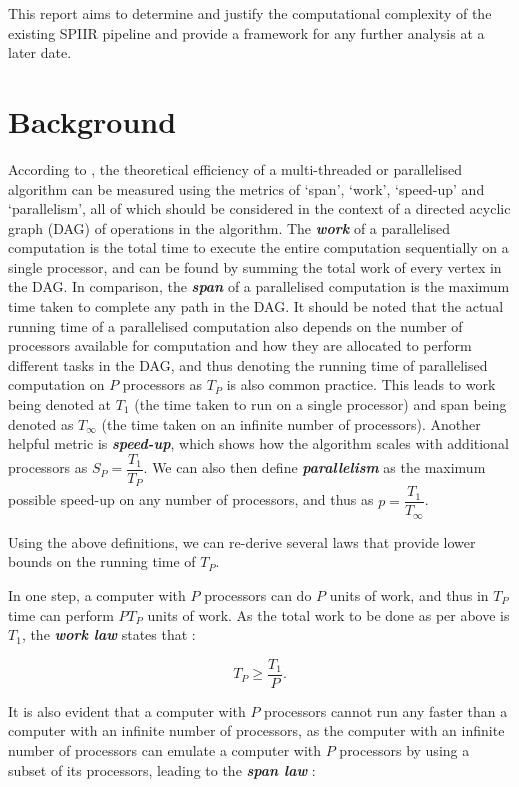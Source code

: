\documentclass{article}
\begin{document}
This report aims to determine and justify the computational complexity of the existing SPIIR pipeline and provide a framework for any further analysis at a later date.

\section{Background} \label{sec:background}

According to \cite{CLRS}, the theoretical efficiency of a multi-threaded or parallelised algorithm can be measured using the metrics of `span', `work', `speed-up' and `parallelism', all of which should be considered in the context of a directed acyclic graph (DAG) of operations in the algorithm.
The \textit{\textbf{work}} of a parallelised computation is the total time to execute the entire computation sequentially on a single processor, and can be found by summing the total work of every vertex in the DAG.
In comparison, the \textit{\textbf{span}} of a parallelised computation is the maximum time taken to complete any path in the DAG.
It should be noted that the actual running time of a parallelised computation also depends on the number of processors available for computation and how they are allocated to perform different tasks in the DAG, and thus denoting the running time of parallelised computation on \(P\) processors as \(T_P\) is also common practice.
This leads to work being denoted at \(T_1\) (the time taken to run on a single processor) and span being denoted as \(T_\infty\) (the time taken on an infinite number of processors).
Another helpful metric is \textit{\textbf{speed-up}}, which shows how the algorithm scales with additional processors as \(S_P = \dfrac{T_1}{T_P}\).
We can also then define \textit{\textbf{parallelism}} as the maximum possible speed-up on any number of processors, and thus as \(p = \dfrac{T_1}{T_\infty}\).

Using the above definitions, we can re-derive several laws that provide lower bounds on the running time of \(T_P\).

In one step, a computer with \(P\) processors can do \(P\) units of work, and thus in \(T_P\) time can perform \(PT_P\) units of work.
As the total work to be done as per above is \(T_1\), the \textit{\textbf{work law}} states that \cite{CLRS}:

\[
    T_P \geq \dfrac{T_1}{P}.
\]

It is also evident that a computer with \(P\) processors cannot run any faster than a computer with an infinite number of processors, as the computer with an infinite number of processors can emulate a computer with \(P\) processors by using a subset of its processors, leading to the \textit{\textbf{span law}} \cite{CLRS}:
\end{document}
